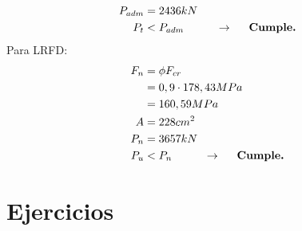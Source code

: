 \begin{example}
\begin{align*}
     P_{adm}&=2436kN\\
     P_{t}&<P_{adm}\hspace{10mm} \rightarrow\textbf{\hspace{5mm}Cumple.}
 \end{align*}
Para LRFD:\\
 \begin{align*}
     F_{n}&=\phi F_{cr}\\
     &=0,9\cdot 178,43 MPa\\
     &=160,59 MPa\\
     A&=228cm^2\\
     P_{n}&=3657kN\\
     P_u&<P_{n}\hspace{10mm} \rightarrow\textbf{\hspace{5mm}Cumple.}
 \end{align*}
\end{example}
\section{Ejercicios}